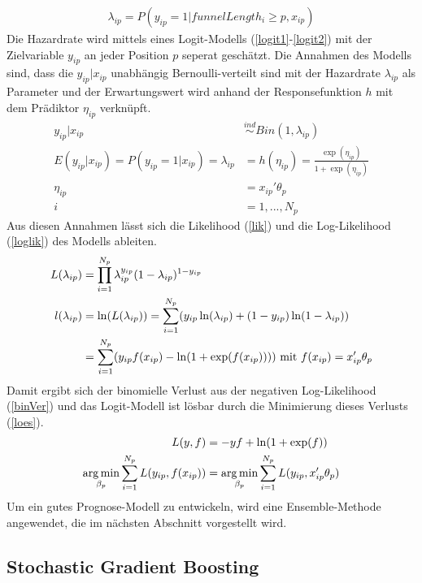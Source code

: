 \begin{align}
	\lambda_{ip} = P(y_{ip}=1|funnelLength_i \geq p, x_{ip}) \label{haz}
\end{align}
Die Hazardrate wird mittels eines Logit-Modells (\ref{logit1}-\ref{logit2}) mit der Zielvariable $y_{ip}$ an jeder Position $p$ seperat geschätzt. Die Annahmen des Modells sind, dass die $y_{ip}|x_{ip}$ unabhängig Bernoulli-verteilt sind mit der Hazardrate $\lambda_{ip}$ als Parameter und der Erwartungswert wird anhand der Responsefunktion $h$ mit dem Prädiktor $\eta_{ip}$ verknüpft.
\begin{align}
	y_{ip}|x_{ip} &\stackrel{ind}{\sim} Bin(1, \lambda_{ip}) \label{logit1} \\
	E(y_{ip}|x_{ip}) = P(y_{ip} = 1|x_{ip}) = \lambda_{ip} &= h(\eta_{ip}) = \frac{\exp(\eta_{ip})}{1+\exp(\eta_{ip})} \\
	\eta_{ip} &= x_{ip}'\theta_p \\
	i &= 1,...,N_p \label{logit2}
\end{align}
Aus diesen Annahmen lässt sich die Likelihood (\ref{lik}) und die Log-Likelihood (\ref{loglik}) des Modells ableiten.
\begin{align}
	L(\lambda_{ip}) &= \prod_{i=1}^{N_p} \lambda_{ip}^{y_{ip}} (1-\lambda_{ip})^{1-y_{ip}} \label{lik} \\
	l(\lambda_{ip}) &= \ln(L(\lambda_{ip})) = \sum_{i=1}^{N_p} (y_{ip} \ln(\lambda_{ip}) + (1-y_{ip}) \ln(1-\lambda_{ip})) \notag \\
	&= \sum_{i=1}^{N_p} (y_{ip} f(x_{ip}) - \ln(1+\exp(f(x_{ip})))) \text{ mit } f(x_{ip}) = x_{ip}'\theta_p \label{loglik}
\end{align}
Damit ergibt sich der binomielle Verlust aus der negativen Log-Likelihood (\ref{binVer}) und das Logit-Modell ist lösbar durch die Minimierung dieses Verlusts (\ref{loes}).
\begin{align}
	L(y,f) &= -yf + \ln(1+\exp(f)) \label{binVer} \\
	\operatorname*{arg\,min}_{\beta_p} \sum_{i=1}^{N_p} L(y_{ip},f(x_{ip})) &= \operatorname*{arg\,min}_{\beta_p} \sum_{i=1}^{N_p} L(y_{ip},x_{ip}'\theta_p) \label{loes}
\end{align}
Um ein gutes Prognose-Modell zu entwickeln, wird eine Ensemble-Methode angewendet, die im nächsten Abschnitt vorgestellt wird.

\subsection{Stochastic Gradient Boosting}\label{secModel2}

